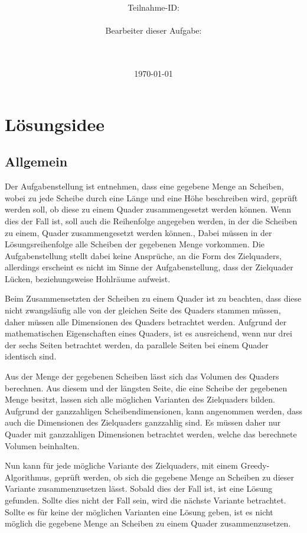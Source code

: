 \documentclass[a4paper,10pt,ngerman]{scrartcl}
\title{\textbf{\Huge\Aufgabe}}
\author{\LARGE Teilnahme-ID: \LARGE \TeilnahmeId \\\\
\LARGE Bearbeiter dieser Aufgabe: \\
\LARGE \Name\\\\}
\date{\LARGE\today}
\begin{document}
    \maketitle
    \tableofcontents
    \vspace{0.5cm}
    \newpage


    \section{Lösungsidee}\label{sec:losungsidee}

    \subsection{Allgemein}\label{subsec:allgemein}

    Der Aufgabenstellung ist entnehmen, dass eine gegebene Menge an Scheiben, wobei zu jede Scheibe durch
    eine Länge und eine Höhe beschreiben wird, geprüft werden soll, ob diese zu einem Quader zusammengesetzt werden können.
    Wenn dies der Fall ist, soll auch die Reihenfolge angegeben werden, in der die Scheiben zu einem, Quader zusammengesetzt werden können.,
    Dabei müssen in der Lösungsreihenfolge alle Scheiben der gegebenen Menge vorkommen.
    Die Aufgabenstellung stellt dabei keine Ansprüche, an die Form des Zielquaders, allerdings erscheint es nicht im Sinne der Aufgabenstellung,
    dass der Zielquader Lücken, beziehungsweise Hohlräume aufweist.

    Beim Zusammensetzten der Scheiben zu einem Quader ist zu beachten, dass diese nicht zwangsläufig alle von der gleichen Seite des Quaders stammen müssen,
    daher müssen alle Dimensionen des Quaders betrachtet werden.
    Aufgrund der mathematischen Eigenschaften eines Quaders, ist es ausreichend, wenn nur drei der sechs Seiten betrachtet werden,
    da parallele Seiten bei einem Quader identisch sind.

    Aus der Menge der gegebenen Scheiben lässt sich das Volumen des Quaders berechnen.
    Aus diesem und der längsten Seite, die eine Scheibe der gegebenen Menge besitzt, lassen sich alle möglichen Varianten des Zielquaders bilden.
    Aufgrund der ganzzahligen Scheibendimensionen, kann angenommen werden, dass auch die Dimensionen des Zielquaders ganzzahlig sind.
    Es müssen daher nur Quader mit ganzzahligen Dimensionen betrachtet werden, welche das berechnete Volumen beinhalten.

    Nun kann für jede mögliche Variante des Zielquaders, mit einem Greedy-Algorithmus, geprüft werden,
    ob sich die gegebene Menge an Scheiben zu dieser Variante zusammenzusetzen lässt.
    Sobald dies der Fall ist, ist eine Lösung gefunden.
    Sollte dies nicht der Fall sein, wird die nächste Variante betrachtet.
    Sollte es für keine der möglichen Varianten eine Lösung geben, ist es nicht möglich die gegebene Menge an Scheiben
    zu einem Quader zusammenzusetzen.
\end{document}
